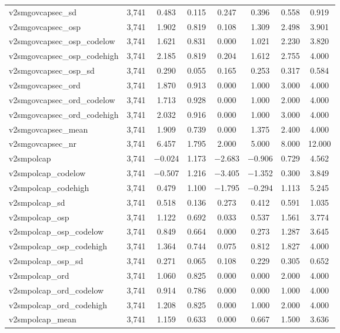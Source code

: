 \begin{table}[!htbp]
\begin{tabular}{@{\extracolsep{5pt}}lccccccc}
v2smgovcapsec\_sd & 3,741 & 0.483 & 0.115 & 0.247 & 0.396 & 0.558 & 0.919 \\ 
v2smgovcapsec\_osp & 3,741 & 1.902 & 0.819 & 0.108 & 1.309 & 2.498 & 3.901 \\ 
v2smgovcapsec\_osp\_codelow & 3,741 & 1.621 & 0.831 & 0.000 & 1.021 & 2.230 & 3.820 \\ 
v2smgovcapsec\_osp\_codehigh & 3,741 & 2.185 & 0.819 & 0.204 & 1.612 & 2.755 & 4.000 \\ 
v2smgovcapsec\_osp\_sd & 3,741 & 0.290 & 0.055 & 0.165 & 0.253 & 0.317 & 0.584 \\ 
v2smgovcapsec\_ord & 3,741 & 1.870 & 0.913 & 0.000 & 1.000 & 3.000 & 4.000 \\ 
v2smgovcapsec\_ord\_codelow & 3,741 & 1.713 & 0.928 & 0.000 & 1.000 & 2.000 & 4.000 \\ 
v2smgovcapsec\_ord\_codehigh & 3,741 & 2.032 & 0.916 & 0.000 & 1.000 & 3.000 & 4.000 \\ 
v2smgovcapsec\_mean & 3,741 & 1.909 & 0.739 & 0.000 & 1.375 & 2.400 & 4.000 \\ 
v2smgovcapsec\_nr & 3,741 & 6.457 & 1.795 & 2.000 & 5.000 & 8.000 & 12.000 \\ 
v2smpolcap & 3,741 & $-$0.024 & 1.173 & $-$2.683 & $-$0.906 & 0.729 & 4.562 \\ 
v2smpolcap\_codelow & 3,741 & $-$0.507 & 1.216 & $-$3.405 & $-$1.352 & 0.300 & 3.849 \\ 
v2smpolcap\_codehigh & 3,741 & 0.479 & 1.100 & $-$1.795 & $-$0.294 & 1.113 & 5.245 \\ 
v2smpolcap\_sd & 3,741 & 0.518 & 0.136 & 0.273 & 0.412 & 0.591 & 1.035 \\ 
v2smpolcap\_osp & 3,741 & 1.122 & 0.692 & 0.033 & 0.537 & 1.561 & 3.774 \\ 
v2smpolcap\_osp\_codelow & 3,741 & 0.849 & 0.664 & 0.000 & 0.273 & 1.287 & 3.645 \\ 
v2smpolcap\_osp\_codehigh & 3,741 & 1.364 & 0.744 & 0.075 & 0.812 & 1.827 & 4.000 \\ 
v2smpolcap\_osp\_sd & 3,741 & 0.271 & 0.065 & 0.108 & 0.229 & 0.305 & 0.652 \\ 
v2smpolcap\_ord & 3,741 & 1.060 & 0.825 & 0.000 & 0.000 & 2.000 & 4.000 \\ 
v2smpolcap\_ord\_codelow & 3,741 & 0.914 & 0.786 & 0.000 & 0.000 & 1.000 & 4.000 \\ 
v2smpolcap\_ord\_codehigh & 3,741 & 1.208 & 0.825 & 0.000 & 1.000 & 2.000 & 4.000 \\ 
v2smpolcap\_mean & 3,741 & 1.159 & 0.633 & 0.000 & 0.667 & 1.500 & 3.636 \\ 

\end{tabular}
\end{table}
